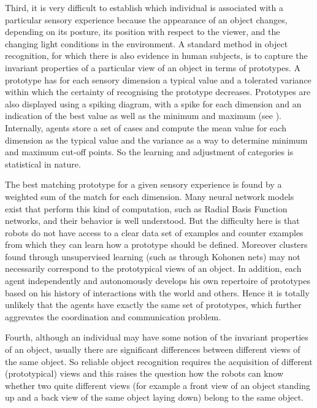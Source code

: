 Third, it is very difficult to establish which individual is associated with a particular
sensory experience because the appearance of an object changes, depending on
its posture, its position with respect to the viewer, and the changing
light conditions in the environment. A standard method in object
recognition, for which there is also evidence in human subjects, is to
capture the invariant properties of a particular view of an object in
terms of prototypes. A prototype has for each sensory dimension a typical value and a tolerated variance
within which the certainty of recognising the prototype decreases. Prototypes are also displayed using a spiking 
diagram, with a spike for each dimension and an indication of the best value as well as the minimum and maximum
(see ). Internally, agents store a set of cases 
and compute the mean value for each dimension as the typical value and the variance as a way to determine 
minimum and maximum cut-off points. So the learning and adjustment of categories is statistical in nature. 

The best matching prototype for a given sensory experience is  
found by a weighted sum of the match for each dimension. Many neural network models exist that perform this kind
of computation, such as Radial Basis Function networks, and their behavior is well
understood. But the difficulty here is that robots do not have access
to a clear data set of examples and counter examples from which they
can learn how a prototype should be defined. Moreover clusters found
through unsupervised learning (such as through Kohonen
nets) may not necessarily correspond to the prototypical
views of an object. In addition, each agent independently and autonomously
develops his own repertoire of prototypes based on his history of
interactions with the world and others. Hence it is totally unlikely
that the agents have exactly the same set of prototypes, which
further aggrevates the coordination and communication problem. 

Fourth, although an individual may have some notion of the invariant properties
of an object, usually
there are significant differences between different views of the same
object. So reliable object recognition requires the acquisition of
different (prototypical) views and this raises the question how the
robots can know whether two quite different views (for example a front
view of an object standing up and a back view of the same object
laying down) belong to the same object. 

